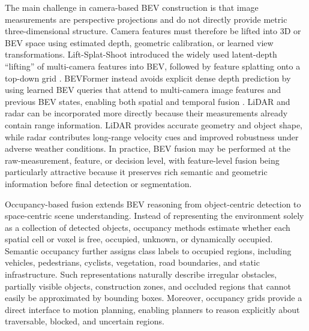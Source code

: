 The main challenge in camera-based BEV construction is that image measurements are perspective projections and do not directly provide metric three-dimensional structure. Camera features must therefore be lifted into 3D or BEV space using estimated depth, geometric calibration, or learned view transformations. Lift-Splat-Shoot introduced the widely used latent-depth ``lifting'' of multi-camera features into BEV, followed by feature splatting onto a top-down grid \cite{philion2020_lss}. BEVFormer instead avoids explicit dense depth prediction by using learned BEV queries that attend to multi-camera image features and previous BEV states, enabling both spatial and temporal fusion \cite{li2022_bevformer}. LiDAR and radar can be incorporated more directly because their measurements already contain range information. LiDAR provides accurate geometry and object shape, while radar contributes long-range velocity cues and improved robustness under adverse weather conditions. In practice, BEV fusion may be performed at the raw-measurement, feature, or decision level, with feature-level fusion being particularly attractive because it preserves rich semantic and geometric information before final detection or segmentation.

Occupancy-based fusion extends BEV reasoning from object-centric detection to space-centric scene understanding. Instead of representing the environment solely as a collection of detected objects, occupancy methods estimate whether each spatial cell or voxel is free, occupied, unknown, or dynamically occupied. Semantic occupancy further assigns class labels to occupied regions, including vehicles, pedestrians, cyclists, vegetation, road boundaries, and static infrastructure. Such representations naturally describe irregular obstacles, partially visible objects, construction zones, and occluded regions that cannot easily be approximated by bounding boxes. Moreover, occupancy grids provide a direct interface to motion planning, enabling planners to reason explicitly about traversable, blocked, and uncertain regions.


